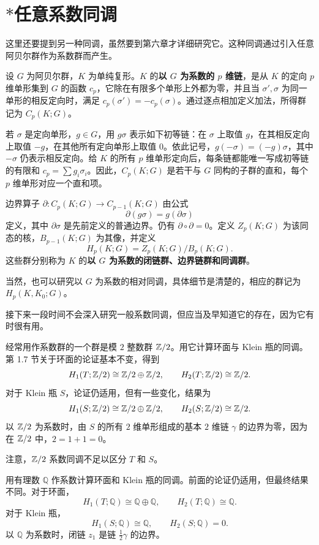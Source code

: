 \section{\texorpdfstring{$*$}{*}任意系数同调}
这里还要提到另一种同调，虽然要到第六章才详细研究它。这种同调通过引入任意阿贝尔群作为系数群而产生。

设 $G$ 为阿贝尔群，$K$ 为单纯复形。$K$ 的\textbf{以 $G$ 为系数的 $p$ 维链}，是从 $K$ 的定向 $p$ 维单形集到 $G$ 的函数 $c_p$，它除在有限多个单形上外都为零，并且当 $\sigma',\sigma$ 为同一单形的相反定向时，满足 $c_p(\sigma')=-c_p(\sigma)$。通过逐点相加定义加法，所得群记为 $C_p(K;G)$。

若 $\sigma$ 是定向单形，$g\in G$，用 $g\sigma$ 表示如下初等链：在 $\sigma$ 上取值 $g$，在其相反定向上取值 $-g$，在其他所有定向单形上取值 $0$。依此记号，$g(-\sigma)=(-g)\sigma$，其中 $-\sigma$ 仍表示相反定向。给 $K$ 的所有 $p$ 维单形定向后，每条链都能唯一写成初等链的有限和 $c_p=\sum g_i\sigma_i$。因此，$C_p(K;G)$ 是若干与 $G$ 同构的子群的直和，每个 $p$ 维单形对应一个直和项。

边界算子 $\partial:C_p(K;G)\to C_{p-1}(K;G)$ 由公式
\[
\partial(g\sigma)=g(\partial\sigma)
\]
定义，其中 $\partial\sigma$ 是先前定义的普通边界。仍有 $\partial\circ\partial=0$。定义 $Z_p(K;G)$ 为该同态的核，$B_{p-1}(K;G)$ 为其像，并定义
\[
H_p(K;G)=Z_p(K;G)/B_p(K;G).
\]
这些群分别称为 $K$ 的\textbf{以 $G$ 为系数的闭链群、边界链群和同调群}。

当然，也可以研究以 $G$ 为系数的相对同调，具体细节是清楚的，相应的群记为 $H_p(K,K_0;G)$。

接下来一段时间不会深入研究一般系数同调，但应当及早知道它的存在，因为它有时很有用。

经常用作系数群的一个群是模 $2$ 整数群 $\mathbb{Z}/2$。用它计算环面与 Klein 瓶的同调。第 1.7 节关于环面的论证基本不变，得到
\[
H_1(T;\mathbb{Z}/2)\cong\mathbb{Z}/2\oplus\mathbb{Z}/2,\qquad H_2(T;\mathbb{Z}/2)\cong\mathbb{Z}/2.
\]
对于 Klein 瓶 $S$，论证仍适用，但有一些变化，结果为
\[
H_1(S;\mathbb{Z}/2)\cong\mathbb{Z}/2\oplus\mathbb{Z}/2,\qquad H_2(S;\mathbb{Z}/2)\cong\mathbb{Z}/2.
\]
以 $\mathbb{Z}/2$ 为系数时，由 $S$ 的所有 $2$ 维单形组成的基本 $2$ 维链 $\gamma$ 的边界为零，因为在 $\mathbb{Z}/2$ 中，$2=1+1=0$。

注意，$\mathbb{Z}/2$ 系数同调不足以区分 $T$ 和 $S$。

用有理数 $\mathbb Q$ 作系数计算环面和 Klein 瓶的同调。前面的论证仍适用，但最终结果不同。对于环面，
\[
H_1(T;\mathbb Q)\cong\mathbb Q\oplus\mathbb Q,\qquad H_2(T;\mathbb Q)\cong\mathbb Q.
\]
对于 Klein 瓶，
\[
H_1(S;\mathbb Q)\cong\mathbb Q,\qquad H_2(S;\mathbb Q)=0.
\]
以 $\mathbb Q$ 为系数时，闭链 $z_1$ 是链 $\tfrac12\gamma$ 的边界。

